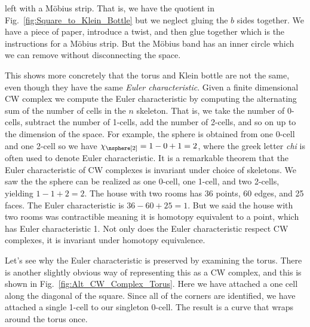 \documentclass{book}                                                           %
\begin{document}
            left with a M\"{o}bius strip. That is, we have the quotient in
            Fig.~\ref{fig:Square_to_Klein_Bottle} but we neglect gluing the
            $b$ sides together. We have a piece of paper, introduce a twist, and
            then glue together which is the instructions for a M\"{o}bius strip.
            But the M\"{o}bius band has an inner circle which we can remove
            without disconnecting the space.
            \par\hfill\par
            This shows more concretely that the torus and Klein bottle are not
            the same, even though they have the same
            \textit{Euler characteristic}. Given a finite dimensional CW complex
            we compute the Euler characteristic by computing the alternating sum
            of the number of cells in the $n$ skeleton. That is, we take the
            number of 0-cells, subtract the number of 1-cells, add the number of
            2-cells, and so on up to the dimension of the space. For example,
            the sphere is obtained from one 0-cell and one 2-cell so we have
            $\chi_{\nsphere[2]}=1-0+1=2$, where the greek letter \textit{chi} is
            often used to denote Euler characteristic. It is a remarkable
            theorem that the Euler characteristic of CW complexes is invariant
            under choice of skeletons. We saw the the sphere can be realized as
            one 0-cell, one 1-cell, and two 2-cells, yielding $1-1+2=2$. The
            house with two rooms has 36 points, 60 edges, and 25 faces. The
            Euler characteristic is $36-60+25=1$. But we said the house with
            two rooms was contractible meaning it is homotopy equivalent to a
            point, which has Euler characteristic 1. Not only does the Euler
            characteristic respect CW complexes, it is invariant under homotopy
            equivalence.
            \par\hfill\par
            \begin{minipage}[t]{0.64\textwidth}
                Let's see why the Euler characteristic is preserved by
                examining the torus. There is another slightly obvious way of
                representing this as a CW complex, and this is shown in
                Fig.~\ref{fig:Alt_CW_Complex_Torus}. Here we have attached
                a one cell along the diagonal of the square. Since all of the
                corners are identified, we have attached a single 1-cell to our
                singleton 0-cell. The result is a curve that wraps around the
                torus once.
            \end{minipage}
\end{document}
